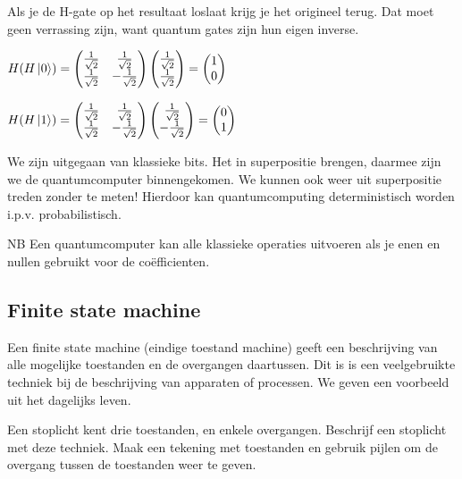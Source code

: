 \documentclass[../../main.tex]{subfiles}
\begin{document}
Als je de H-gate op het resultaat loslaat krijg je het origineel terug. Dat moet geen verrassing zijn, want quantum gates zijn hun eigen inverse.

$H(H\ket{0})=
\begin{pmatrix} 
\tfrac{1}{\sqrt{2}} & \tfrac{1}{\sqrt{2}}  \\ 
\tfrac{1}{\sqrt{2}} & -\tfrac{1}{\sqrt{2}} 
\end{pmatrix} 
\begin{pmatrix} 
\tfrac{1}{\sqrt{2}}  \\ 
\tfrac{1}{\sqrt{2}}
\end{pmatrix} 
=
\begin{pmatrix} 
1\\
0
\end{pmatrix} 
$

$H(H\ket{1})=
\begin{pmatrix} 
\tfrac{1}{\sqrt{2}} & \tfrac{1}{\sqrt{2}}  \\ 
\tfrac{1}{\sqrt{2}} & -\tfrac{1}{\sqrt{2}} 
\end{pmatrix} 
\begin{pmatrix} 
\tfrac{1}{\sqrt{2}}  \\ 
-\tfrac{1}{\sqrt{2}}
\end{pmatrix} 
=
\begin{pmatrix} 
0\\
1
\end{pmatrix} 
$

We zijn uitgegaan van klassieke bits. Het in superpositie brengen, daarmee zijn we de quantumcomputer binnengekomen. We kunnen ook weer uit superpositie treden zonder te meten! Hierdoor kan quantumcomputing deterministisch worden i.p.v. probabilistisch.

NB Een quantumcomputer kan alle klassieke operaties uitvoeren als je enen en nullen gebruikt voor de co\"efficienten.

\subsection{Finite state machine}
Een finite state machine (eindige toestand machine) geeft een beschrijving van alle mogelijke toestanden en de overgangen daartussen. Dit is is een veelgebruikte techniek bij de beschrijving van apparaten of processen. We geven een voorbeeld uit het dagelijks leven.
 
\normal Een stoplicht kent drie toestanden, en enkele overgangen. Beschrijf een stoplicht met deze techniek. Maak een tekening met toestanden en gebruik pijlen om de overgang tussen de toestanden weer te geven. 
\end{document}
